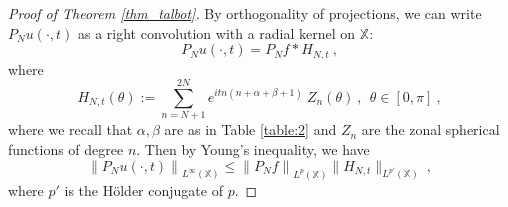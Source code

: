 \documentclass[12pt]{amsart}
\theoremstyle{definition}
\newcommand{\X}{\mathbb X}%
\numberwithin{equation}{section}
\begin{document}
\begin{proof}[Proof of Theorem \ref{thm_talbot}]
By orthogonality of projections, we can write $P_Nu(\cdot,t)$ as a right convolution with a radial kernel on $\X$:
\begin{equation*}
P_Nu(\cdot,t)=P_Nf * H_{N,t}\:,
\end{equation*}
where
\begin{equation} \label{thm_talbot_pf_eq3} 
H_{N,t}(\theta):= \sum_{n=N+1}^{2N} e^{itn(n+\alpha+\beta+1)}\:Z_n(\theta)\:,\:\:\theta \in [0,\pi]\:,
\end{equation}
where we recall that $\alpha,\beta$ are as in Table \ref{table:2} and $Z_n$ are the zonal spherical functions of degree $n$. Then by Young's inequality, we have
\begin{equation} \label{thm_talbot_pf_eq4}
\left\|P_Nu(\cdot,t)\right\|_{L^\infty(\X)} \le \left\|P_Nf\right\|_{L^p(\X)}\|H_{N,t}\|_{L^{p'}(\X)}\:,
\end{equation}
where $p'$ is the H\"older conjugate of $p$.


\end{proof}
\end{document}
